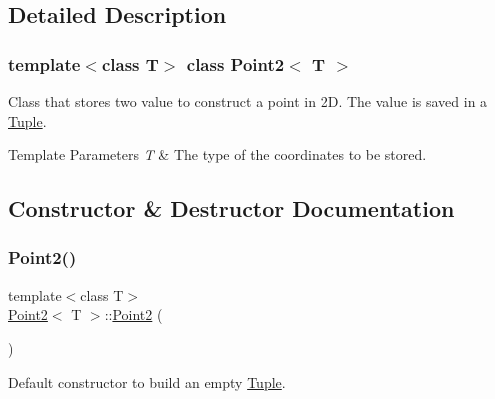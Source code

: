 \subsection{Detailed Description}
\subsubsection*{template$<$class T$>$\newline
class Point2$<$ T $>$}

Class that stores two value to construct a point in 2D. The value is saved in a \mbox{\hyperlink{class_tuple}{Tuple}}. 


\begin{DoxyTemplParams}{Template Parameters}
{\em T} & The type of the coordinates to be stored. \\
\hline
\end{DoxyTemplParams}


\subsection{Constructor \& Destructor Documentation}
\mbox{\label{class_point2_a4674f9e2fab693fc83afd5af234100d3}} 
\subsubsection{\texorpdfstring{Point2()}{Point2()}\hspace{0.1cm}{\footnotesize\ttfamily [1/3]}}
{\footnotesize\ttfamily template$<$class T$>$ \\
\mbox{\hyperlink{class_point2}{Point2}}$<$ T $>$\+::\mbox{\hyperlink{class_point2}{Point2}} (\begin{DoxyParamCaption}{ }\end{DoxyParamCaption})\hspace{0.3cm}{\ttfamily [inline]}}



Default constructor to build an empty \mbox{\hyperlink{class_tuple}{Tuple}}. 

\mbox{\label{class_point2_ae743063a4348bef19448aabf90901cb3}} 
